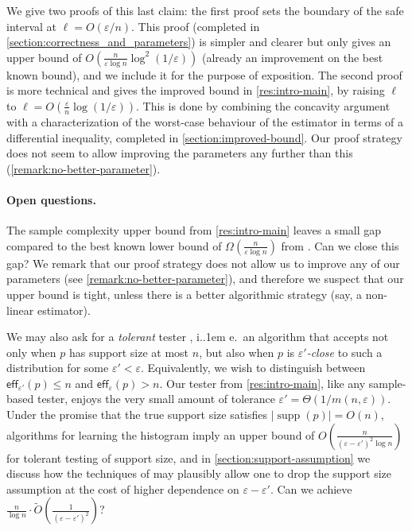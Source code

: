 \documentclass{theoretics}
\newcommand*\ie{i.\kern.1em e.\ }
\DeclareMathOperator{\supp}{supp}   %
\newcommand{\eff}{\mathsf{eff}}
\renewcommand{\epsilon}{\varepsilon}
\begin{document}
{We give two proofs of this last claim: the first proof sets the boundary of the safe interval at
$\ell = O(\epsilon/n)$. This proof (completed in \cref{section:correctness_and_parameters}) is
simpler and clearer but only gives an upper bound of $O(\tfrac{n}{\epsilon \log
n}\log^2(1/\epsilon))$ (already an improvement on the best known bound), and we include it for the
purpose of exposition. The second proof is more technical and gives the improved bound in
\cref{res:intro-main}, by raising $\ell$ to $\ell = O(\tfrac{\epsilon}{n}\log(1/\epsilon))$. This is
done by combining the concavity argument with a characterization of the worst-case behaviour of the
estimator in terms of a differential inequality, completed in \cref{section:improved-bound}. Our
proof strategy does not seem to allow improving the parameters any further than this
(\cref{remark:no-better-parameter}).
}

\paragraph*{Open questions.}

The sample complexity upper bound from \cref{res:intro-main} leaves a small gap compared to the best
known lower bound of $\Omega(\tfrac{n}{\epsilon \log n})$ from \cite{VV11stoc,WY19}. Can we close
this gap? We remark that our proof strategy does not allow us to improve any of our parameters (see
\cref{remark:no-better-parameter}), and therefore we suspect that our upper bound is tight, unless
there is a better algorithmic strategy (say, a non-linear estimator).

We may also ask for a \emph{tolerant} tester \cite{PRR06}, \ie an algorithm that accepts not only
when $p$ has support size at most $n$, but also when $p$ is \emph{$\epsilon'$-close} to such a
distribution for some $\epsilon' < \epsilon$. Equivalently, we wish to distinguish between
$\eff_{\epsilon'}(p) \le n$ and $\eff_\epsilon(p) > n$. Our tester from \cref{res:intro-main}, like
any sample-based tester, enjoys the very small amount of tolerance $\epsilon' = \Theta(1 /
m(n,\epsilon))$. Under the promise that the true support size satisfies $|\supp(p)| = O(n)$,
algorithms for learning the histogram \cite{VV11stoc,VV17,HJW18,HO19pml} imply an upper bound of
$O\left(\tfrac{n}{(\epsilon-\epsilon')^2 \log n}\right)$ for tolerant testing of support size, and
in \cref{section:support-assumption} we discuss how the techniques of \cite{VV16} may plausibly
allow one to drop the support size assumption at the cost of higher dependence on
$\epsilon-\epsilon'$. Can we achieve $\tfrac{n}{\log n} \cdot \widetilde
O\left(\tfrac{1}{(\epsilon-\epsilon')^2}\right)$?
\end{document}

